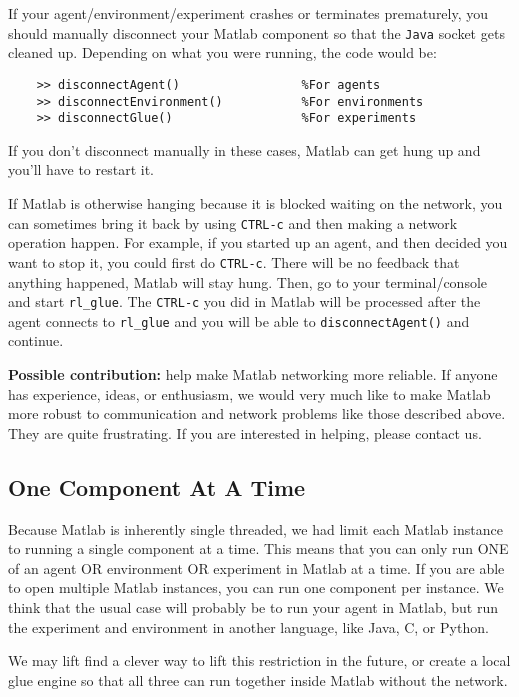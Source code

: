 \documentclass[11pt]{article}
\begin{document}
If your agent/environment/experiment crashes or terminates prematurely, you should manually disconnect your Matlab component so that the \texttt{Java} socket gets cleaned up.  Depending on what you were running, the code would be:
\begin{verbatim}
	>> disconnectAgent()                 %For agents
	>> disconnectEnvironment()           %For environments
	>> disconnectGlue()                  %For experiments
\end{verbatim}

If you don't disconnect manually in these cases, Matlab can get hung up and you'll have to restart it.

If Matlab is otherwise hanging because it is blocked waiting on the network, you can sometimes bring it back by using \texttt{CTRL-c} and then making a network operation happen.  For example, if you started up an agent, and then decided you want to stop it, you could first do  \texttt{CTRL-c}.  There will be no feedback that anything happened, Matlab will stay hung. Then, go to your terminal/console and start \texttt{rl\_glue}.  The \texttt{CTRL-c} you did in Matlab will be processed after the agent connects to \texttt{rl\_glue} and you will be able to \texttt{disconnectAgent()} and continue.

\textbf{Possible contribution:}  help make Matlab networking more reliable.  If anyone has experience, ideas, or enthusiasm, we would very much like to make Matlab more robust to communication and network problems like those described above.  They are quite frustrating.  If you are interested in helping, please contact us.


\subsection{One Component At A Time}
\label{one-at-a-time}
Because Matlab is inherently single threaded, we had limit each Matlab instance to running a single component at a time.  This means that you can only run ONE of an agent OR environment OR experiment in Matlab at a time.  If you are able to open multiple Matlab instances, you can run one
component per instance.  We think that the usual case will probably be to run your agent in Matlab, but run the experiment and environment in another language, like Java, C, or Python.

We may lift find a clever way to lift this restriction in the future, or create a local glue engine so that all three can run together inside Matlab without the network.
\end{document}
